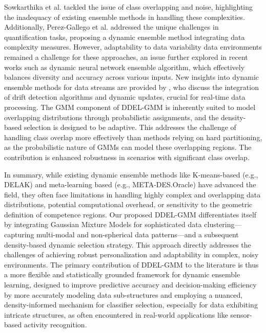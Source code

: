 \documentclass[lettersize,journal]{IEEEtran}
\newcommand{\greenhighlight}[1]{#1} %
\begin{document}
Sowkarthika et al. \cite{b_data_2023} tackled the issue of class overlapping and noise, highlighting the inadequacy of existing ensemble methods in handling these complexities. Additionally, Perez-Gallego et al. \cite{perez-gallego_dynamic_2019} addressed the unique challenges in quantification tasks, proposing a dynamic ensemble method integrating data complexity measures. However, adaptability to data variability data environments remained a challenge for these approaches, an issue further explored in recent works such as \cite{alam_dynamic_2020} dynamic neural network ensemble algorithm, which effectively balances diversity and accuracy across various inputs. New insights into dynamic ensemble methods for data streams are provided by \cite{gomes_survey_2017}, who discuss the integration of drift detection algorithms and dynamic updates, crucial for real-time data processing. \greenhighlight{The GMM component of DDEL-GMM is inherently suited to model overlapping distributions through probabilistic assignments, and the density-based selection is designed to be adaptive. This addresses the challenge of handling class overlap more effectively than methods relying on hard partitioning, as the probabilistic nature of GMMs can model these overlapping regions. The contribution is enhanced robustness in scenarios with significant class overlap.}

\greenhighlight{In summary, while existing dynamic ensemble methods like K-means-based (e.g., DELAK) and meta-learning based (e.g., META-DES.Oracle) have advanced the field, they often face limitations in handling highly complex and overlapping data distributions, potential computational overhead, or sensitivity to the geometric definition of competence regions. Our proposed DDEL-GMM differentiates itself by integrating Gaussian Mixture Models for sophisticated data clustering—capturing multi-modal and non-spherical data patterns—and a subsequent density-based dynamic selection strategy. This approach directly addresses the challenges of achieving robust personalization and adaptability in complex, noisy environments. The primary contribution of DDEL-GMM to the literature is thus a more flexible and statistically grounded framework for dynamic ensemble learning, designed to improve predictive accuracy and decision-making efficiency by more accurately modeling data sub-structures and employing a nuanced, density-informed mechanism for classifier selection, especially for data exhibiting intricate structures, as often encountered in real-world applications like sensor-based activity recognition.}
\end{document}

